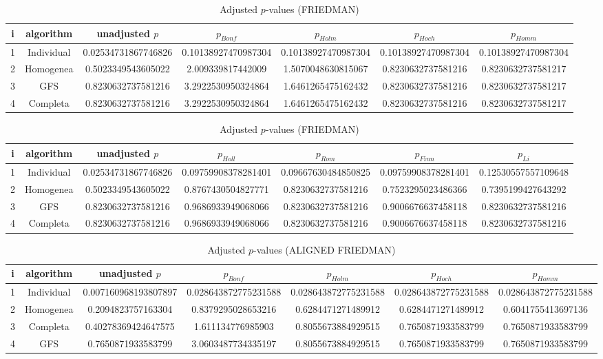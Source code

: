 \documentclass[a4paper,10pt]{article}
\begin{document}
\begin{landscape}
\begin{table}[!htp]
\centering\scriptsize
\caption{Adjusted $p$-values (FRIEDMAN)}
\begin{tabular}{ccccccc}
i&algorithm&unadjusted $p$&$p_{Bonf}$&$p_{Holm}$&$p_{Hoch}$&$p_{Homm}$\\
\hline
1&Individual&0.02534731867746826&0.10138927470987304&0.10138927470987304&0.10138927470987304&0.10138927470987304\\
2&Homogenea&0.5023349543605022&2.009339817442009&1.5070048630815067&0.8230632737581216&0.8230632737581217\\
3&GFS&0.8230632737581216&3.2922530950324864&1.6461265475162432&0.8230632737581216&0.8230632737581217\\
4&Completa&0.8230632737581216&3.2922530950324864&1.6461265475162432&0.8230632737581216&0.8230632737581217\\
\hline
\end{tabular}
\end{table}

\begin{table}[!htp]
\centering\scriptsize
\caption{Adjusted $p$-values (FRIEDMAN)}
\begin{tabular}{ccccccc}
i&algorithm&unadjusted $p$&$p_{Holl}$&$p_{Rom}$&$p_{Finn}$&$p_{Li}$\\
\hline
1&Individual&0.02534731867746826&0.09759908378281401&0.09667630484850825&0.09759908378281401&0.12530557557109648\\
2&Homogenea&0.5023349543605022&0.8767430504827771&0.8230632737581216&0.7523295023486366&0.7395199427643292\\
3&GFS&0.8230632737581216&0.9686933949068066&0.8230632737581216&0.9006676637458118&0.8230632737581216\\
4&Completa&0.8230632737581216&0.9686933949068066&0.8230632737581216&0.9006676637458118&0.8230632737581216\\
\hline
\end{tabular}
\end{table}


\newpage

\begin{table}[!htp]
\centering\scriptsize
\caption{Adjusted $p$-values (ALIGNED FRIEDMAN)}
\begin{tabular}{ccccccc}
i&algorithm&unadjusted $p$&$p_{Bonf}$&$p_{Holm}$&$p_{Hoch}$&$p_{Homm}$\\
\hline
1&Individual&0.007160968193807897&0.028643872775231588&0.028643872775231588&0.028643872775231588&0.028643872775231588\\
2&Homogenea&0.2094823757163304&0.8379295028653216&0.6284471271489912&0.6284471271489912&0.6041755413697136\\
3&Completa&0.40278369424647575&1.611134776985903&0.8055673884929515&0.7650871933583799&0.7650871933583799\\
4&GFS&0.7650871933583799&3.0603487734335197&0.8055673884929515&0.7650871933583799&0.7650871933583799\\
\hline
\end{tabular}
\end{table}


\end{landscape}
\end{document}
